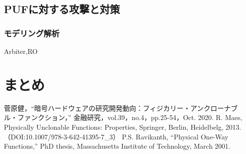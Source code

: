 \documentclass[technicalreport]{ieicej} %
\begin{document}
\subsection{PUFに対する攻撃と対策}
\subsubsection{モデリング解析}
Arbiter,RO
\section{まとめ}


%
%
\begin{thebibliography}{99}%
  菅原健，“暗号ハードウェアの研究開発動向：フィジカリー・アンクローナブル・ファンクション，”
  金融研究，vol.39，no.4，pp.25-54，Oct. 2020.
  R. Maes, Physically Unclonable Functions: Properties, Springer, Berlin, Heidelbelg, 2013.
  （DOI:10.1007/978-3-642-41395-7\_3）
  P.S. Ravikanth, “Physical One-Way Functions,” PhD thesis,
  Massachusetts Institute of Technology, March 2001.


\end{thebibliography}
\end{document}
